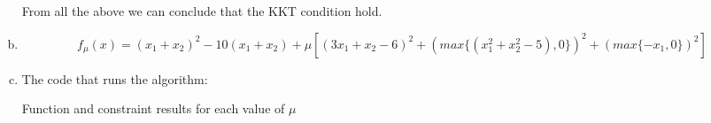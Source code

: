 \documentclass{article}
\begin{document}
\begin{enumerate}[(a)]
From all the above we can conclude that the KKT condition hold.
\item
\[
f_\mu(x) = (x_1 + x_2)^2 - 10(x_1 + x_2) + \mu [(3x_1 + x_2 - 6)^2 + (max\{(x_1^2 + x_2^2 - 5), 0\})^2 + (max\{-x_1, 0\})^2]
\]
\item The code that runs the algorithm:
\begin{scriptsize}
\begin{tcolorbox}[%
    enhanced,
    breakable,
    frame hidden,
    overlay broken = {
        \draw[line width=0.5mm, black, rounded corners]
        (frame.north west) rectangle (frame.south east);},
    ]{}
%
\end{tcolorbox}
\end{scriptsize}
Function and constraint results for each value of $\mu$
\begin{scriptsize}
\begin{tcolorbox}[%
    enhanced,
    breakable,
    frame hidden,
    overlay broken = {
        \draw[line width=0.5mm, black, rounded corners]
        (frame.north west) rectangle (frame.south east);},
    ]{}
\end{tcolorbox}
\end{scriptsize}
\end{enumerate}
\end{document}

